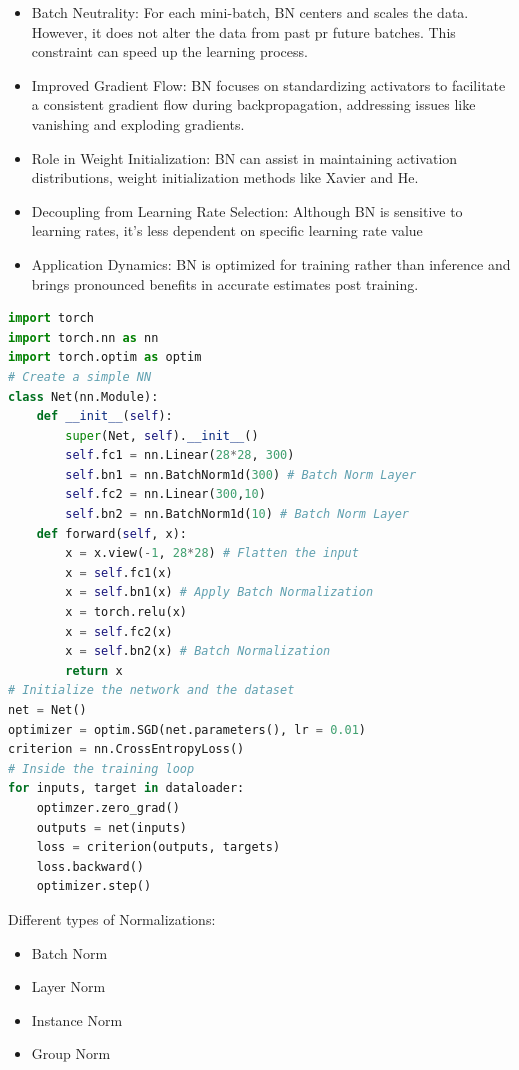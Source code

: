 \documentclass{article}
\begin{document}
\begin{itemize}
    \item Batch Neutrality: For each mini-batch, BN centers and scales the data. However, it does not alter the data from past pr future batches. This constraint can speed up the learning process.
    \item Improved Gradient Flow: BN focuses on standardizing activators to facilitate a consistent gradient flow during backpropagation, addressing issues like vanishing and exploding gradients. 
    \item Role in Weight Initialization: BN can assist in maintaining activation distributions, weight initialization methods like Xavier and He.
    \item Decoupling from Learning Rate Selection: Although BN is sensitive to learning rates, it's less dependent on specific learning rate value
    \item Application Dynamics: BN is optimized for training rather than inference and brings pronounced benefits in accurate estimates post training.
\end{itemize}
\begin{lstlisting}[language=Python]
import torch
import torch.nn as nn
import torch.optim as optim
# Create a simple NN
class Net(nn.Module):
    def __init__(self):
        super(Net, self).__init__()
        self.fc1 = nn.Linear(28*28, 300)
        self.bn1 = nn.BatchNorm1d(300) # Batch Norm Layer
        self.fc2 = nn.Linear(300,10)
        self.bn2 = nn.BatchNorm1d(10) # Batch Norm Layer
    def forward(self, x):
        x = x.view(-1, 28*28) # Flatten the input
        x = self.fc1(x)
        x = self.bn1(x) # Apply Batch Normalization
        x = torch.relu(x)
        x = self.fc2(x)
        x = self.bn2(x) # Batch Normalization
        return x
# Initialize the network and the dataset
net = Net()
optimizer = optim.SGD(net.parameters(), lr = 0.01)
criterion = nn.CrossEntropyLoss()
# Inside the training loop
for inputs, target in dataloader:
    optimzer.zero_grad()
    outputs = net(inputs)
    loss = criterion(outputs, targets)
    loss.backward()
    optimizer.step()
\end{lstlisting}
Different types of Normalizations:
\begin{itemize}
    \item Batch Norm
    \item Layer Norm
    \item Instance Norm
    \item Group Norm
\end{itemize}
\end{document}
